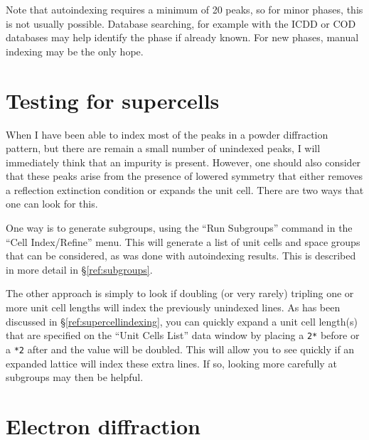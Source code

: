 Note that autoindexing requires a minimum of 20 peaks, so for minor phases, this is not usually possible. Database searching, for example with the ICDD or COD databases may help identify the phase if already known. For new phases, manual indexing may be the only hope. 

\section{Testing for supercells}

When I have been able to index most of the peaks in a powder diffraction pattern, but there are remain a small number of unindexed peaks, I will immediately think that an impurity is present.  However, one should also consider that these peaks arise from the presence of lowered symmetry that either removes a  reflection extinction condition or expands the unit cell. There are two ways that one can look for this. 

One way is to generate subgroups, using the ``Run Subgroups'' command in the ``Cell Index/Refine'' menu. This will generate a list of unit cells and space groups that can be considered, as was done with autoindexing results. This is described in more detail in \S\ref{ref:subgroups}.

The other approach is simply to look if doubling (or very rarely) tripling one or more unit cell lengths will index the previously unindexed lines. As has been discussed in \S\ref{ref:supercellindexing}, you can quickly expand a unit cell length(s) that are specified on the ``Unit Cells List'' data window by placing a \texttt{2*} before or a \texttt{*2} after and the value will be doubled. This will allow you to see quickly if an expanded lattice will index these extra lines. If so, looking more carefully at subgroups may then be helpful. 

\section{Electron diffraction}

